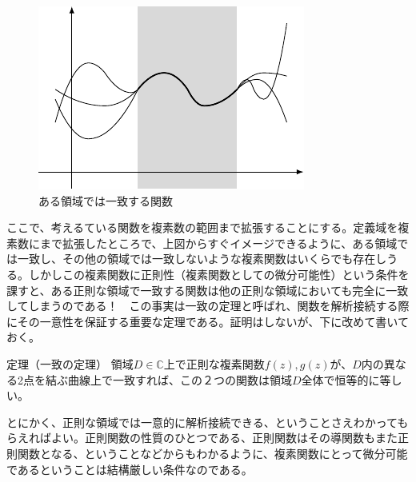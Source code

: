 \documentclass[11pt,b5paper,papersize,dvipdfmx]{jsbook}
\begin{document}
\begin{figure}[H]
  \centering
  \includegraphics{nkym/fig/seisoku.pdf}
  \caption{ある領域では一致する関数}
  \label{fig:seisoku}
\end{figure}

ここで、考えるている関数を複素数の範囲まで拡張することにする。定義域を複素数にまで拡張したところで、上図からすぐイメージできるように、ある領域では一致し、その他の領域では一致しないような複素関数はいくらでも存在しうる。しかしこの複素関数に正則性（複素関数としての微分可能性）という条件を課すと、ある正則な領域で一致する関数は他の正則な領域においても完全に一致してしまうのである！　この事実は一致の定理と呼ばれ、関数を解析接続する際にその一意性を保証する重要な定理である。証明はしないが、下に改めて書いておく。
\begin{thm}{定理（一致の定理）}
  領域$D \in \mathbb{C}$上で正則な複素関数$f(z), g(z)$が、$D$内の異なる2点を結ぶ曲線上で一致すれば、この２つの関数は領域$D$全体で恒等的に等しい。
\end{thm}
とにかく、正則な領域では一意的に解析接続できる、ということさえわかってもらえればよい。正則関数の性質のひとつである、正則関数はその導関数もまた正則関数となる、ということなどからもわかるように、複素関数にとって微分可能であるということは結構厳しい条件なのである。\par
\end{document}
